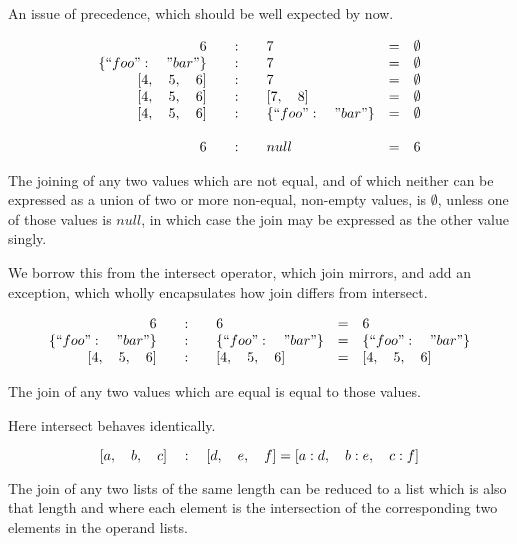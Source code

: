 \documentclass[letterpaper]{article}
\begin{document}
An issue of precedence, which should be well expected by now.

\begin{prule}
\begin{equation}
\begin{array}{rclcl}
6 \quad&:&\quad 7 & = & \emptyset \\
\{``foo":\quad"bar"\} \quad&:&\quad 7 & = & \emptyset \\
{[}4,\quad5,\quad6] \quad&:&\quad 7 & = & \emptyset \\
{[}4,\quad5,\quad6] \quad&:&\quad {[}7,\quad8] & = & \emptyset \\
{[}4,\quad5,\quad6] \quad&:&\quad \{``foo":\quad"bar"\} & = & \emptyset \\
\\
6 \quad&:&\quad null & = & 6 \\
\end{array}
\end{equation}

The joining of any two values which are not equal, and of which neither
can be expressed as a union of two or more non-equal, non-empty values, is
\(\emptyset\), unless one of those values is \(null\), in which case the join
may be expressed as the other value singly.
\end{prule}

We borrow this from the intersect operator, which join mirrors, and add an
exception, which wholly encapsulates how join differs from intersect.

\begin{prule}
\begin{equation}
\begin{array}{rclcl}
6 \quad&:&\quad 6 & = & 6 \\
\{``foo":\quad"bar"\} \quad&:&\quad \{``foo":\quad"bar"\}  & = & \{``foo":\quad"bar"\} \\
{[}4,\quad5,\quad6] \quad&:&\quad {[}4,\quad5,\quad6] & = & {[}4,\quad5,\quad6] \\
\end{array}
\end{equation}

The join of any two values which are equal is equal to those values.
\end{prule}

Here intersect behaves identically.

\begin{prule}
\begin{equation}
{[}a,\quad b,\quad c] \quad:\quad {[}d,\quad e,\quad f]  =  {[}a: d,\quad
b: e,\quad c: f] \\
\end{equation}

The join of any two lists of the same length can be reduced to a list
which is also that length and where each element is the intersection of the
corresponding two elements in the operand lists.
\end{prule}
\end{document}

